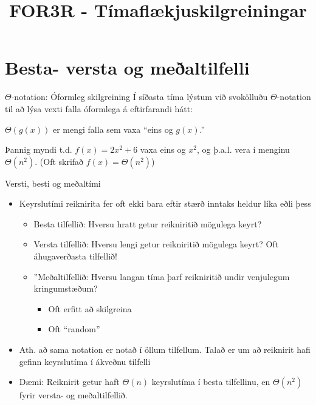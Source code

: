 \documentclass{beamer}
\title{FOR3R - Tímaflækjuskilgreiningar}
\begin{document}
\begin{frame}
\titlepage
\end{frame}

\section{Besta- versta og meðaltilfelli}

\begin{frame}{$\Theta$-notation: Óformleg skilgreining}
Í síðasta tíma lýstum við svokölluðu $\Theta$-notation til að lýsa vexti falla óformlega á eftirfarandi hátt:

\begin{center}
$\Theta(g(x))$ er mengi falla sem vaxa ``eins og $g(x)$.''
\end{center}

Þannig myndi t.d. $f(x) = 2 x^2 + 6$ vaxa eins og $x^2$, og þ.a.l. vera í menginu $\Theta(n^2)$. (Oft skrifað $f(x) = \Theta(n^2)$)
\end{frame}

\begin{frame}{Versti, besti og meðaltími}
\begin{itemize}
 \item Keyrslutími reiknirita fer oft ekki bara eftir stærð inntaks heldur líka eðli þess
 \begin{itemize}
  \item Besta tilfellið: Hversu hratt getur reikniritið mögulega keyrt?
  \item Versta tilfellið: Hversu lengi getur reikniritið mögulega keyrt? Oft áhugaverðasta tilfellið!
  \item ''Meðaltilfellið: Hversu langan tíma þarf reikniritið undir venjulegum kringumstæðum?
  \begin{itemize}
   \item Oft erfitt að skilgreina
   \item Oft ``random''
  \end{itemize}
 \end{itemize}
 \item Ath. að sama notation er notað í öllum tilfellum. Talað er um að reiknirit hafi gefinn keyrslutíma í ákveðnu tilfelli
 \item Dæmi: Reiknirit getur haft $\Theta(n)$ keyrslutíma í besta tilfellinu, en $\Theta(n^2)$ fyrir versta- og meðaltilfellið.
\end{itemize}
\end{frame}
\end{document}
